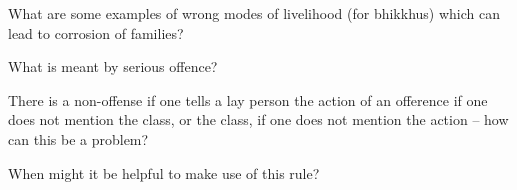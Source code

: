 

What are some examples of wrong modes of livelihood (for bhikkhus) which can lead to corrosion of families?

\bigskip

% 
% 
% 
% 


What is meant by serious offence?

\bigskip

There is a non-offense if one tells a lay person the action of an ofference if
one does not mention the class, or the class, if one does not mention the action
– how can this be a problem?

\bigskip


When might it be helpful to make use of this rule?

\bigskip

%
%

